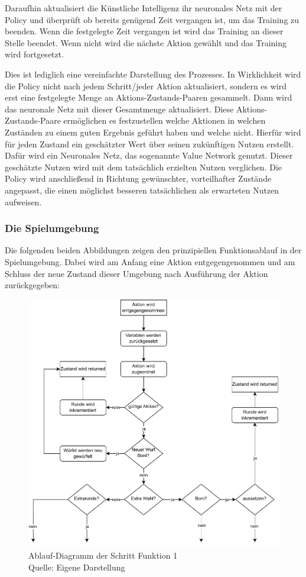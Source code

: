 Daraufhin aktualisiert die Künstliche Intelligenz ihr neuronales Netz mit der Policy und überprüft ob bereits genügend Zeit vergangen ist, um das Training zu beenden. Wenn die festgelegte Zeit vergangen ist wird das Training an dieser Stelle beendet. Wenn nicht wird die nächste Aktion gewählt und das Training wird fortgesetzt.

Dies ist lediglich eine vereinfachte Darstellung des Prozesses. In Wirklichkeit wird die Policy nicht nach jedem Schritt/jeder Aktion aktualisiert, sondern es wird erst eine festgelegte Menge an Aktions-Zustands-Paaren gesammelt. Dann wird das neuronale Netz mit dieser Gesamtmenge aktualisiert. Diese Aktions-Zustands-Paare ermöglichen es festzustellen welche Aktionen in welchen Zuständen zu einem guten Ergebnis geführt haben und welche nicht. Hierfür wird für jeden Zustand ein geschätzter Wert über seinen zukünftigen Nutzen erstellt. Dafür wird ein Neuronales Netz, das sogenannte Value Network genutzt. Dieser geschätzte Nutzen wird mit dem tatsächlich erzielten Nutzen verglichen. Die Policy wird anschließend in Richtung gewünschter, vorteilhafter Zustände angepasst, die einen möglichst besseren tatsächlichen als erwarteten Nutzen aufweisen.
\subsubsection{Die Spielumgebung}
Die folgenden beiden Abbildungen zeigen den prinzipiellen Funktionsablauf in der Spielumgebung. Dabei wird am Anfang eine Aktion entgegengenommen und am Schluss der neue Zustand dieser Umgebung nach Ausführung der Aktion zurückgegeben:
\nopagebreak
\begin{figure}[H]
	\includegraphics[width=1\textwidth]{Bilder/step3.drawio} 
	\caption[Ablauf-Diagramm der Schritt Funktion 1]{Ablauf-Diagramm der Schritt Funktion 1\\ Quelle: Eigene Darstellung}
\end{figure}	

